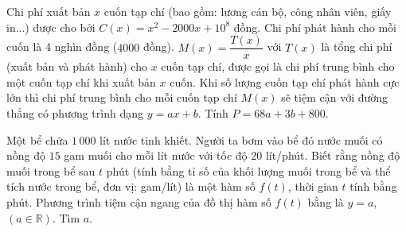 \begin{bt}%
	Chi phí xuất bản $x$ cuốn tạp chí (bao gồm: lương cán bộ, công nhân viên, giấy in...) được cho bởi $C(x) = x^2 - 2000x + 10^8$ đồng. Chi phí phát hành cho mỗi cuốn là 4 nghìn đồng ($4000$ đồng). $M(x) = \dfrac{T(x)}{x}$ với $T(x)$ là tổng chi phí (xuất bản và phát hành) cho $x$  cuốn tạp chí, được gọi là chi phí trung bình cho một cuốn tạp chí khi xuất bản $x$ cuốn. Khi số lượng cuốn tạp chí phát hành cực lớn thì chi phí trung bình cho mỗi cuốn tạp chí $M(x)$ sẽ tiệm cận với đường thẳng có phương trình dạng $y=ax+b$. Tính $P=68a+3b+800$.
\end{bt}

\begin{bt}%
	Một bể chứa $1\,000$ lít nước tinh khiết. Người ta bơm vào bể đó nước muối có nồng độ $15$ gam muối cho mỗi lít nước  với tốc độ $20$ lít/phút. Biết rằng nồng độ muối trong bể sau $t$ phút (tính bằng tỉ số của khối lượng muối trong bể và thể tích nước trong bể, đơn vị: gam/lít) là một hàm số $f(t)$, thời gian $t$ tính bằng phút. Phương trình tiệm cận ngang của đồ thị hàm số $f(t)$ bằng là $y=a$, $(a \in \mathbb{R})$. Tìm $a$.
\end{bt}

